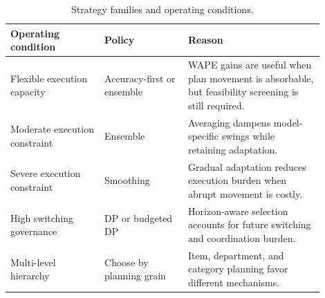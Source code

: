 \begin{table}[H]
\centering
\caption{Strategy families and operating conditions.}
\label{tab:strategy-guidance}
\scriptsize
\renewcommand{\arraystretch}{0.85}
\begin{tabular}{@{}p{0.27\linewidth}p{0.24\linewidth}p{0.39\linewidth}@{}}
\toprule
\textbf{Operating condition} & \textbf{Policy} & \textbf{Reason} \\
\midrule
Flexible execution capacity & Accuracy-first or ensemble & WAPE gains are useful when plan movement is absorbable, but feasibility screening is still required. \\
Moderate execution constraint & Ensemble & Averaging dampens model-specific swings while retaining adaptation. \\
Severe execution constraint & Smoothing & Gradual adaptation reduces execution burden when abrupt movement is costly. \\
High switching governance & DP or budgeted DP & Horizon-aware selection accounts for future switching and coordination burden. \\
Multi-level hierarchy & Choose by planning grain & Item, department, and category planning favor different mechanisms. \\
\bottomrule
\end{tabular}
\end{table}
